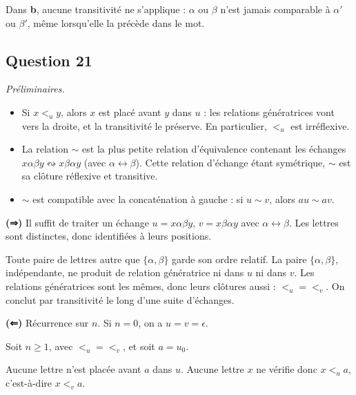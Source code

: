 \documentclass[11pt,a4paper]{article}
\providecommand{\tightlist}{\setlength{\itemsep}{0pt}\setlength{\parskip}{0pt}}
\begin{document}
Dans \textbf{b}, aucune transitivité ne s'applique : \(\alpha\) ou \(\beta\) n'est jamais comparable à \(\alpha'\) ou \(\beta'\), même lorsqu'elle la précède dans le mot.

\hypertarget{question-21}{%
\subsection{Question 21}\label{question-21}}

\emph{Préliminaires.}

\begin{itemize}
\tightlist
\item
  Si \(x<_uy\), alors \(x\) est placé avant \(y\) dans \(u\) : les relations génératrices vont vers la droite, et la transitivité le préserve. En particulier, \(<_u\) est irréflexive.
\item
  La relation \(\sim\) est la plus petite relation d'équivalence contenant les échanges \(x\alpha\beta y\leftrightsquigarrow x\beta\alpha y\) (avec \(\alpha\leftrightarrow\beta\)). Cette relation d'échange étant symétrique, \(\sim\) est sa clôture réflexive et transitive.
\item
  \(\sim\) est compatible avec la concaténation à gauche : si \(u\sim v\), alors \(au\sim av\).
\end{itemize}

\textbf{(⇒)} Il suffit de traiter un échange \(u=x\alpha\beta y\), \(v=x\beta\alpha y\) avec \(\alpha\leftrightarrow\beta\). Les lettres sont distinctes, donc identifiées à leurs positions.

Toute paire de lettres autre que \(\{\alpha,\beta\}\) garde son ordre relatif. La paire \(\{\alpha,\beta\}\), indépendante, ne produit de relation génératrice ni dans \(u\) ni dans \(v\). Les relations génératrices sont les mêmes, donc leurs clôtures aussi : \(<_u=<_v\). On conclut par transitivité le long d'une suite d'échanges.

\textbf{(⇐)} Récurrence sur \(n\). Si \(n=0\), on a \(u=v=\epsilon\).

Soit \(n\ge1\), avec \(<_u=<_v\), et soit \(a=u_0\).

Aucune lettre n'est placée avant \(a\) dans \(u\). Aucune lettre \(x\) ne vérifie donc \(x<_ua\), c'est-à-dire \(x<_va\).
\end{document}
